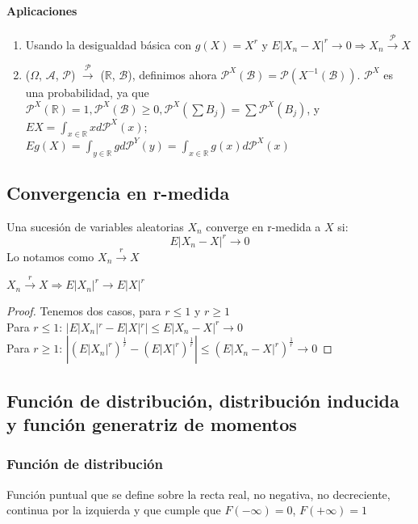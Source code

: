 \paragraph{Aplicaciones}
\begin{enumerate}
\item Usando la desigualdad básica con $g(X) = X^r$ y $E|X_n - X|^r \to 0 \Rightarrow X_n \stackrel{\mathcal{P}}{\rightarrow} X$
\item ($\Omega$, $\mathcal{A}$, $\mathcal{P}$) $\stackrel{\mathcal{P}}{\rightarrow}$ ($\mathbb{R}$, $\mathcal{B}$), definimos ahora $\mathcal{P}^X(\mathcal{B}) = \mathcal{P}(X^{-1}(\mathcal{B}))$. $\mathcal{P}^X$ es una probabilidad, ya que $\mathcal{P}^X(\mathbb{R}) = 1, \mathcal{P}^X(\mathcal{B}) \geq 0, \mathcal{P}^X(\sum B_j) = \sum \mathcal{P}^X(B_j)$, y $EX = \displaystyle \int_{x \in \mathbb{R}} x d \mathcal{P}^X(x)$; $Eg(X) = \displaystyle \int_{y \in \mathbb{R}} g d \mathcal{P}^Y(y) = \displaystyle \int_{x \in \mathbb{R}} g(x) d \mathcal{P}^X(x)$
\end{enumerate}

\subsection{Convergencia en r-medida}
Una sucesión de variables aleatorias $X_n$ converge en r-medida a $X$ si:
$$ E|X_n - X|^r \to 0$$
Lo notamos como $X_n \stackrel{r}{\rightarrow} X$

\begin{lemma}
$X_n \stackrel{r}{\rightarrow} X \Rightarrow E|X_n|^r \rightarrow E|X|^r$
\end{lemma}

\begin{proof}
Tenemos dos casos, para $r \leq 1$ y $r \geq 1$\\

Para $r \leq 1$: $|E|X_n|^r - E|X|^r| \leq E|X_n - X|^r \rightarrow 0$\\

Para $r \geq 1$: $|(E|X_n|^r)^{\frac{1}{r}} - (E|X|^r)^{\frac{1}{r}}| \leq (E|X_n - X|^r)^{\frac{1}{r}} \rightarrow 0$
\end{proof}

\subsection{Función de distribución, distribución inducida y función generatriz de momentos}
\subsubsection{Función de distribución}
Función puntual que se define sobre la recta real, no negativa, no decreciente, continua por la izquierda y que cumple que $F(-\infty) = 0$, $F(+\infty) = 1$\\

